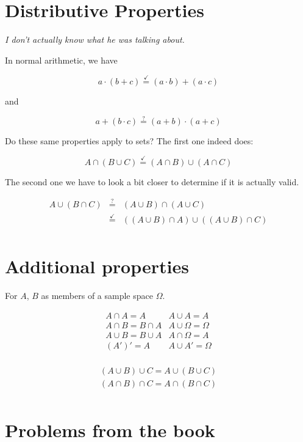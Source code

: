 \documentclass{article}
\begin{document}
\section*{Distributive Properties}

\textit{I don't actually know what he was talking about.}

In normal arithmetic, we have

\[
a\cdot(b+c)\overset{\checkmark}{=}(a\cdot b)+(a\cdot c)
\]

and

\[
a+(b\cdot c)\overset{?}{=}(a+b)\cdot(a+c)
\]

Do these same properties apply to sets? The first one indeed does:

\[
A\cap(B\cup C)\overset{\checkmark}{=}(A\cap B)\cup(A\cap C)
\]

The second one we have to look a bit closer to determine if it is
actually valid.

\[
\begin{array}{rcl}
A\cup(B\cap C) & \overset{?}{=} & (A\cup B)\cap(A\cup C) \\
               & \overset{\checkmark}{=} & ((A\cup B)\cap A)\cup((A\cup B)\cap C) \\
\end{array}
\]

\section*{Additional properties}

For $A$, $B$ as members of a sample space $\Omega$.

\[
\begin{array}{c|c}
A\cap A=A & A\cup A=A \\
A\cap B=B\cap A & A\cup\Omega=\Omega \\
A\cup B=B\cup A & A\cap\Omega=A \\
(A')' = A & A\cup A'=\Omega \\
\end{array}
\]

\[
\begin{array}{c}
(A\cup B)\cup C=A\cup(B\cup C) \\
(A\cap B)\cap C = A\cap (B\cap C) \\
\end{array}
\]

\section*{Problems from the book}
\end{document}

